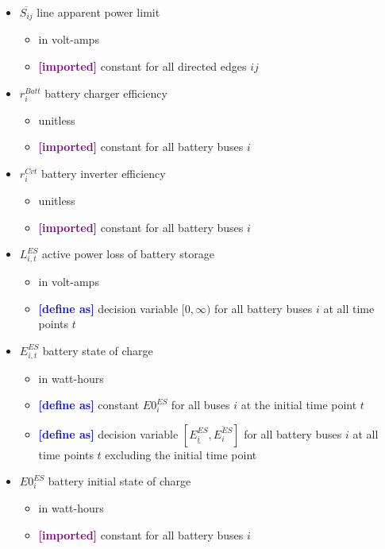 \documentclass{article}
\newcommand{\lo}[1]{\underline{#1}}
\newcommand{\hi}[1]{\overline{#1}}
\newcommand{\define}{\textcolor{blue}{\textbf{[define as] }}}
\newcommand{\imported}{\textcolor{purple}{\textbf{[imported] }}}
\begin{document}
\begin{itemize}
\item $\hi{S_{ij}}$ line apparent power limit
  \begin{itemize}
  \item in volt-amps
  \item \imported constant for all directed edges $ij$
  \end{itemize}

\item $r^{Batt}_i$ battery charger efficiency
  \begin{itemize}
  \item unitless
  \item \imported constant for all battery buses $i$
  \end{itemize}

\item $r^{Cvt}_i$ battery inverter efficiency
  \begin{itemize}
  \item unitless
  \item \imported constant for all battery buses $i$
  \end{itemize}

\item $L^{ES}_{i,t}$ active power loss of battery storage
  \begin{itemize}
  \item in volt-amps
  \item \define decision variable $[0, \infty)$ for all battery buses $i$ at all
    time points $t$
  \end{itemize}

\item $E^{ES}_{i,t}$ battery state of charge
  \begin{itemize}
  \item in watt-hours
  \item \define constant $E0^{ES}_i$ for all buses $i$ at the initial time point
    $t$
  \item \define decision variable $[\lo{E^{ES}_i}, \hi{E^{ES}_i}]$ for all
    battery buses $i$ at all time points $t$ excluding the initial time point
  \end{itemize}

\item $E0^{ES}_i$ battery initial state of charge
  \begin{itemize}
  \item in watt-hours
  \item \imported constant for all battery buses $i$
  \end{itemize}


\end{itemize}
\end{document}
